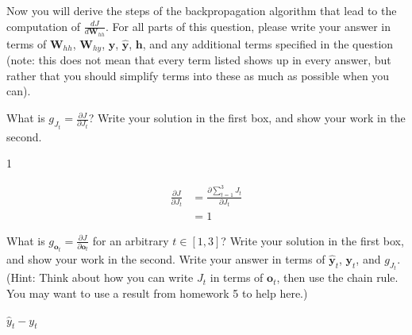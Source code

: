\documentclass[11pt,addpoints,answers]{exam}
\newcommand{\hv}{\mathbf{h}}
\newcommand{\ov}{\mathbf{o}}
\newcommand{\yv}{\mathbf{y}}
\newcommand{\Wv}{\mathbf{W}}
\begin{document}
\begin{questions}
\begin{parts}
\begin{subparts}
\subpart Now you will derive the steps of the backpropagation algorithm that lead to the computation of $\frac{dJ}{d\Wv_{hh}}$. For all parts of this question, please write your answer in terms of $\Wv_{hh}$, $\Wv_{hy}$, $\yv$, $\hat{\yv}$, $\hv$, and any additional terms specified in the question (note: this does not mean that every term listed shows up in every answer, but rather that you should simplify terms into these as much as possible when you can).
\clearpage
    \begin{subsubparts}
        \subsubpart[2] What is $g_{J_t} = \frac{\partial J}{\partial J_t}$? Write your solution in the first box, and show your work in the second.
        
    \begin{your_solution}[title=$\frac{\partial J}{\partial J_t}$,height=2.5cm,width=8.5cm]
    1
    \end{your_solution}
    
    \begin{your_solution}[title=Work,height=6cm,width=14cm]
	\[
	\begin{aligned}
		\frac{\partial J}{\partial J_t} &= \frac{\partial \sum_{t=1}^3 J_t}{\partial J_t} \\
										&= 1
	\end{aligned}
	\]    
    \end{your_solution}

     \subsubpart[2] What is $g_{\ov_t} = \frac{\partial J}{\partial \ov_t}$ for an arbitrary $t \in [1,3]$? Write your solution in the first box, and show your work in the second. Write your answer in terms of $\hat{\yv}_t$, $\yv_t$, and $g_{J_t}$. (Hint: Think about how you can write $J_t$ in terms of $\ov_t$, then use the chain rule. You may want to use a result from homework 5 to help here.)
        
    \begin{your_solution}[title=$\frac{\partial J}{\partial \ov_t}$,height=2.5cm,width=8.5cm]
    $\hat{y}_{t} - y_{t}$
    \end{your_solution}
    

\end{subsubparts}
\end{subparts}
\end{parts}
\end{questions}
\end{document}
